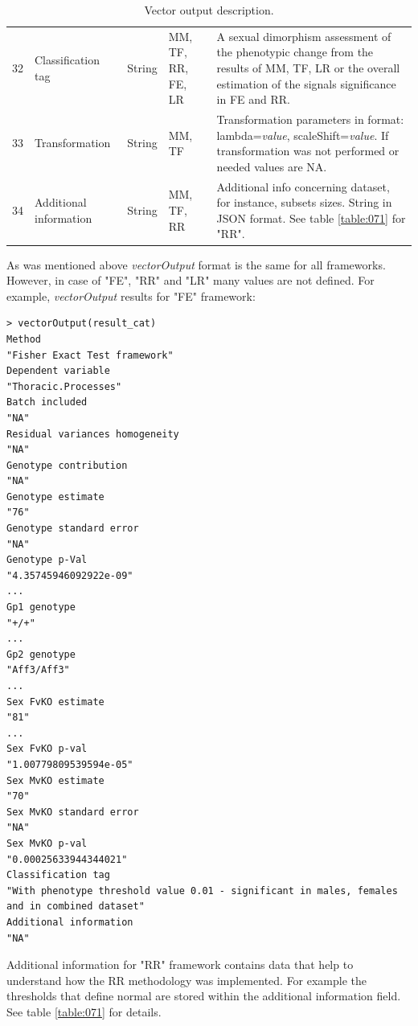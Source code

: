\documentclass[12pt,a4paper]{article}
\begin{document}
\begin{table}
\begin{tabular}{| l | l | l | l | p{10cm} |}
32&Classification tag&String&MM, TF, RR, FE, LR&A sexual dimorphism assessment of the phenotypic change from the results of MM, TF, LR or the overall estimation of the signals significance in FE and RR.\\
33&Transformation&String&MM, TF&Transformation parameters in format: lambda=\textit{value}, scaleShift=\textit{value}. If transformation was not performed or needed values are NA.\\
34&Additional information&String&MM, TF, RR&Additional info concerning dataset, for instance, subsets sizes. String in JSON format. See table \ref{table:071} for "RR".\\
\hline  
\end{tabular}
\caption{Vector output description.}\label{table:07}
\end{table}

As was mentioned above \textit{vectorOutput} format is the same for all frameworks. However, in case of "FE", "RR" and "LR" many values are not defined. For example, \textit{vectorOutput} results for "FE" framework:

\begingroup
\fontsize{8pt}{12pt}\selectfont
\begin{verbatim}
> vectorOutput(result_cat)
Method 
"Fisher Exact Test framework" 
Dependent variable 
"Thoracic.Processes" 
Batch included 
"NA" 
Residual variances homogeneity 
"NA" 
Genotype contribution 
"NA" 
Genotype estimate 
"76" 
Genotype standard error 
"NA" 
Genotype p-Val 
"4.35745946092922e-09" 
...
Gp1 genotype 
"+/+" 
...
Gp2 genotype 
"Aff3/Aff3" 
...
Sex FvKO estimate 
"81" 
...
Sex FvKO p-val 
"1.00779809539594e-05" 
Sex MvKO estimate 
"70" 
Sex MvKO standard error 
"NA" 
Sex MvKO p-val 
"0.00025633944344021" 
Classification tag 
"With phenotype threshold value 0.01 - significant in males, females and in combined dataset" 
Additional information 
"NA" 

\end{verbatim}
\endgroup

Additional information for "RR" framework contains data that help to understand how the RR methodology was implemented. For example the thresholds that define normal are stored within the additional information field. See table \ref{table:071} for details. 
\end{document}
